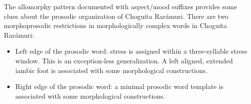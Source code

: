 
The allomorphy pattern documented with aspect/mood suffixes provides some clues about the prosodic organization of Choguita Rarámuri. There are two morphoprosodic restrictions in morphologically complex words in Choguita Rarámuri:

\begin{itemize}
    \item   Left edge of the prosodic word: stress is assigned within a three-syllable stress window. This is an exception-less generalization. A left aligned, extended iambic foot is associated with some morphological constructions.
    \item  Right edge of the prosodic word: a minimal prosodic word template is associated with some morphological constructions.
\end{itemize}
